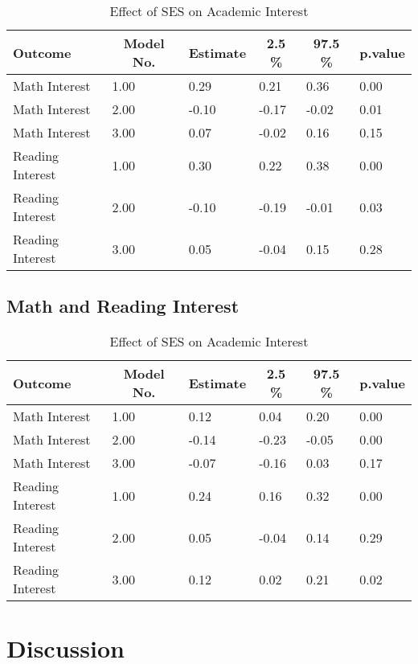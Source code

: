 \documentclass[man]{apa6}
\begin{document}
\begin{table}[tbp]
\begin{center}
\begin{threeparttable}
\caption{\label{tab:unnamed-chunk-1}Effect of SES on Academic Interest}
\begin{tabular}{llllll}
\toprule
Outcome & \multicolumn{1}{c}{Model No.} & \multicolumn{1}{c}{Estimate} & \multicolumn{1}{c}{2.5 \%} & \multicolumn{1}{c}{97.5 \%} & \multicolumn{1}{c}{p.value}\\
\midrule
Math Interest & 1.00 & 0.29 & 0.21 & 0.36 & 0.00\\
Math Interest & 2.00 & -0.10 & -0.17 & -0.02 & 0.01\\
Math Interest & 3.00 & 0.07 & -0.02 & 0.16 & 0.15\\
Reading Interest & 1.00 & 0.30 & 0.22 & 0.38 & 0.00\\
Reading Interest & 2.00 & -0.10 & -0.19 & -0.01 & 0.03\\
Reading Interest & 3.00 & 0.05 & -0.04 & 0.15 & 0.28\\
\bottomrule
\end{tabular}
\end{threeparttable}
\end{center}
\end{table}

\hypertarget{math-and-reading-interest}{%
\subsection{Math and Reading Interest}\label{math-and-reading-interest}}

\begin{table}[tbp]
\begin{center}
\begin{threeparttable}
\caption{\label{tab:unnamed-chunk-2}Effect of SES on Academic Interest}
\begin{tabular}{llllll}
\toprule
Outcome & \multicolumn{1}{c}{Model No.} & \multicolumn{1}{c}{Estimate} & \multicolumn{1}{c}{2.5 \%} & \multicolumn{1}{c}{97.5 \%} & \multicolumn{1}{c}{p.value}\\
\midrule
Math Interest & 1.00 & 0.12 & 0.04 & 0.20 & 0.00\\
Math Interest & 2.00 & -0.14 & -0.23 & -0.05 & 0.00\\
Math Interest & 3.00 & -0.07 & -0.16 & 0.03 & 0.17\\
Reading Interest & 1.00 & 0.24 & 0.16 & 0.32 & 0.00\\
Reading Interest & 2.00 & 0.05 & -0.04 & 0.14 & 0.29\\
Reading Interest & 3.00 & 0.12 & 0.02 & 0.21 & 0.02\\
\bottomrule
\end{tabular}
\end{threeparttable}
\end{center}
\end{table}

\hypertarget{discussion}{%
\section{Discussion}\label{discussion}}
\end{document}
